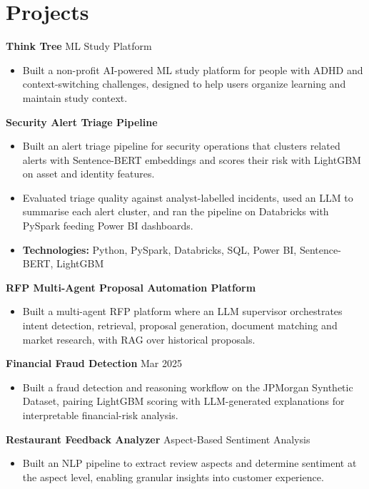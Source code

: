\documentclass[10pt,a4paper]{article}
\begin{document}
\section{Projects}
\textbf{Think Tree} \textbar{} ML Study Platform\par
\begin{itemize}
  \item Built a non-profit AI-powered ML study platform for people with ADHD and context-switching challenges, designed to help users organize learning and maintain study context.
\end{itemize}
\textbf{Security Alert Triage Pipeline}\par
\begin{itemize}
  \item Built an alert triage pipeline for security operations that clusters related alerts with Sentence-BERT embeddings and scores their risk with LightGBM on asset and identity features.
  \item Evaluated triage quality against analyst-labelled incidents, used an LLM to summarise each alert cluster, and ran the pipeline on Databricks with PySpark feeding Power BI dashboards.
  \item \textbf{Technologies:} Python, PySpark, Databricks, SQL, Power BI, Sentence-BERT, LightGBM
\end{itemize}
\textbf{RFP Multi-Agent Proposal Automation Platform}\par
\begin{itemize}
  \item Built a multi-agent RFP platform where an LLM supervisor orchestrates intent detection, retrieval, proposal generation, document matching and market research, with RAG over historical proposals.
\end{itemize}
\textbf{Financial Fraud Detection} \textbar{} Mar 2025\par
\begin{itemize}
  \item Built a fraud detection and reasoning workflow on the JPMorgan Synthetic Dataset, pairing LightGBM scoring with LLM-generated explanations for interpretable financial-risk analysis.
\end{itemize}
\textbf{Restaurant Feedback Analyzer} \textbar{} Aspect-Based Sentiment Analysis\par
\begin{itemize}
  \item Built an NLP pipeline to extract review aspects and determine sentiment at the aspect level, enabling granular insights into customer experience.
\end{itemize}
\end{document}
